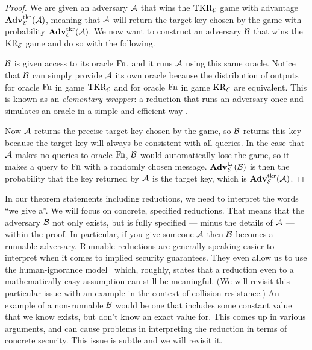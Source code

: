 
\begin{proof}
	We are given an adversary ${\mathcal A}$ that wins the $\textnormal{TKR}_{\cal E}$ game with advantage $\mathbf{Adv}^{\mathrm{tkr}}_{{\cal E}}({\mathcal A})$, meaning that ${\mathcal A}$ will return the target key chosen by the game with probability $\mathbf{Adv}^{\mathrm{tkr}}_{{\cal E}}({\mathcal A})$. We now want to construct an adversary ${\mathcal B}$ that wins the $\textnormal{KR}_{\cal E}$ game and do so with the following.
	\begin{center}
	\end{center}

	${\mathcal B}$ is given access to its oracle $\textnormal{Fn}$, and it runs ${\mathcal A}$ using this same oracle. Notice that ${\mathcal B}$ can simply provide ${\mathcal A}$ its own oracle because the distribution of outputs for oracle $\textnormal{Fn}$ in game $\textnormal{TKR}_{\cal E}$ and for oracle $\textnormal{Fn}$ in game $\textnormal{KR}_{\cal E}$ are equivalent. This is known as an \textit{elementary wrapper}: a reduction that runs an adversary once and simulates an oracle in a simple and efficient way \cite{BonehShoupBook}.
	
	Now ${\mathcal A}$ returns the precise target key chosen by the game, so ${\mathcal B}$ returns this key because the target key will always be consistent with all queries. In the case that ${\mathcal A}$ makes no queries to oracle $\textnormal{Fn}$, ${\mathcal B}$ would automatically lose the game, so it makes a query to $\textnormal{Fn}$ with a randomly chosen message. $\mathbf{Adv}^{\mathrm{kr}}_{{\cal E}}({\mathcal B})$ is then the probability that the key returned by ${\mathcal A}$ is the target key, which is $\mathbf{Adv}^{\mathrm{tkr}}_{{\cal E}}({\mathcal A})$.
\end{proof}


In our theorem statements including reductions,  we need to interpret the words
``we give a''. We will focus on concrete, specified reductions. That means that
the adversary ${\mathcal B}$ not only exists, but is fully specified  --- minus the
details of ${\mathcal A}$ ---  within the proof.  In particular, if you give someone
${\mathcal A}$ then ${\mathcal B}$ becomes a runnable adversary.  Runnable reductions are generally
speaking easier to interpret when it comes to implied security guarantees. They
even allow us to use the human-ignorance model~\cite{rogaway2006formalizing}
which, roughly, states that a reduction even to a mathematically easy assumption
can still be meaningful. (We will revisit this particular issue with an example
in the context of collision resistance.)
An example of a non-runnable ${\mathcal B}$ would be one that includes some constant
value that we know exists, but don't know an exact value for. This comes up in
various arguments, and can cause problems in interpreting the reduction in terms
of concrete security.  This issue is subtle and we will revisit it.

